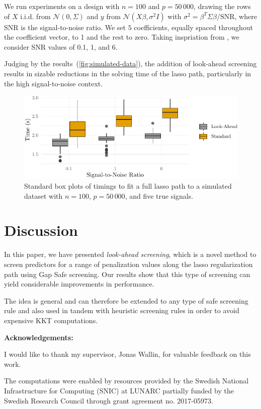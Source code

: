 \documentclass[b5paper,10pt,abstractoff,DIV=calc,headings=normal,twoside]{scrartcl}
\newcommand{\acknowledgements}{\par\mbox{}\par\noindent\textbf{Acknowledgements: }}
\theoremstyle{plain}
\theoremstyle{definition}
\theoremstyle{remark}
\begin{document}
We
run experiments on a design with \(n = 100\) and \(p = 50\,000\),
drawing the rows of \(X\) i.i.d.
from \(\mathcal{N}(0, \Sigma)\) and \(y\)
from \(\mathcal{N}(X\beta, \sigma^2I)\) with \(\sigma^2 =
\beta^T\Sigma\beta/\text{SNR}\), where SNR is the signal-to-noise ratio.  We set
\(5\) coefficients, equally spaced throughout the coefficient vector, to 1 and
the rest to zero. Taking inspriation from \citet{hastie2020}, we
consider SNR values of 0.1, 1, and 6.

Judging by the results~(\autoref{fig:simulated-data}), the addition of
look-ahead screening results in sizable reductions in the solving time of
the lasso path, particularly in the high signal-to-noise context.

\begin{figure}[hbtp]
  \centering
  \includegraphics{figures/simulateddata-timings.pdf}
  \caption{Standard box plots of timings to fit a full lasso path to
    a simulated dataset with \(n = 100\), \(p = 50\,000\), and five true
    signals.}
  \label{fig:simulated-data}
\end{figure}

\section{Discussion}

In this paper, we have presented \emph{look-ahead screening}, which is a
novel method to screen predictors for a range of penalization values along
the lasso regularization path using Gap Safe screening. Our results show that
this type of screening can yield considerable improvements in performance.

The idea is general and can therefore be extended to any type of safe screening
rule and also used in tandem with heuristic screening rules in order to avoid
expensive KKT computations.

\acknowledgements{
  I would like to thank my supervisor, Jonas Wallin, for valuable feedback
  on this work.

  The computations were enabled by resources provided by the Swedish
  National Infrastructure for Computing (SNIC) at LUNARC partially funded
  by the Swedish Research Council through grant agreement no. 2017-05973.
}

\end{document}
